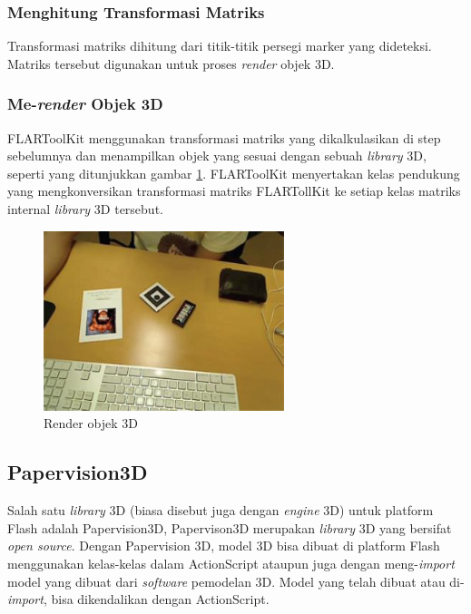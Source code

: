 \subsubsection {Menghitung Transformasi Matriks}
\label{subsubsec:calculate_transform_matrix}
Transformasi matriks dihitung dari titik-titik persegi marker yang dideteksi. Matriks tersebut digunakan untuk proses \textit{render} objek 3D.%
%

\subsubsection {Me-\textit{render} Objek 3D}
\label{subsubsec:render_the_3d_objects}
FLARToolKit menggunakan transformasi matriks yang dikalkulasikan di step sebelumnya dan menampilkan objek yang sesuai dengan sebuah \textit{library} 3D, seperti yang ditunjukkan gambar \ref{fig:render_3d_objects}. FLARToolKit menyertakan kelas pendukung yang mengkonversikan transformasi matriks FLARTollKit ke setiap kelas matriks internal \textit{library} 3D tersebut.

\begin{figure}[h!]
\begin{center}
\includegraphics[width=7cm]{./images/flartk/render_3d_objects.JPG}
\caption{\label{fig:render_3d_objects} Render objek 3D}
\end{center}
\end{figure} 

\subsection {Papervision3D}
\label{subsec:Papervision3D}
Salah satu \textit{library} 3D (biasa disebut juga dengan \textit{engine} 3D) untuk platform Flash adalah Papervision3D, Papervison3D merupakan \textit{library} 3D yang bersifat \textit{open source}. Dengan Papervision 3D, model 3D bisa dibuat di platform Flash menggunakan kelas-kelas dalam ActionScript ataupun juga dengan meng-\textit{import} model yang dibuat dari \textit{software} pemodelan 3D. Model yang telah dibuat atau di-\textit{import}, bisa dikendalikan dengan ActionScript.


